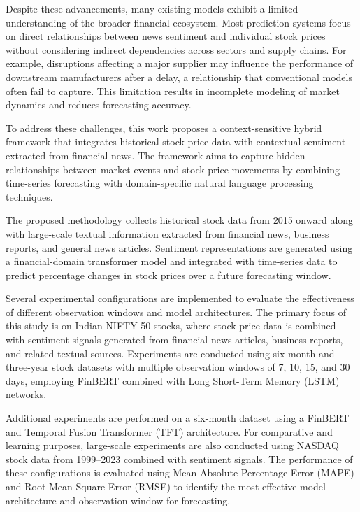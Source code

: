 \documentclass[11pt]{article}
\begin{document}
Despite these advancements, many existing models exhibit a limited understanding of the broader financial ecosystem. Most prediction systems focus on direct relationships between news sentiment and individual stock prices without considering indirect dependencies across sectors and supply chains. For example, disruptions affecting a major supplier may influence the performance of downstream manufacturers after a delay, a relationship that conventional models often fail to capture. This limitation results in incomplete modeling of market dynamics and reduces forecasting accuracy.

To address these challenges, this work proposes a context-sensitive hybrid framework that integrates historical stock price data with contextual sentiment extracted from financial news. The framework aims to capture hidden relationships between market events and stock price movements by combining time-series forecasting with domain-specific natural language processing techniques.

The proposed methodology collects historical stock data from 2015 onward along with large-scale textual information extracted from financial news, business reports, and general news articles. Sentiment representations are generated using a financial-domain transformer model and integrated with time-series data to predict percentage changes in stock prices over a future forecasting window.

Several experimental configurations are implemented to evaluate the effectiveness of different observation windows and model architectures. The primary focus of this study is on Indian NIFTY 50 stocks, where stock price data is combined with sentiment signals generated from financial news articles, business reports, and related textual sources. Experiments are conducted using six-month and three-year stock datasets with multiple observation windows of 7, 10, 15, and 30 days, employing FinBERT combined with Long Short-Term Memory (LSTM) networks. 

Additional experiments are performed on a six-month dataset using a FinBERT and Temporal Fusion Transformer (TFT) architecture. For comparative and learning purposes, large-scale experiments are also conducted using NASDAQ stock data from 1999–2023 combined with sentiment signals. The performance of these configurations is evaluated using Mean Absolute Percentage Error (MAPE) and Root Mean Square Error (RMSE) to identify the most effective model architecture and observation window for forecasting.
\end{document}
